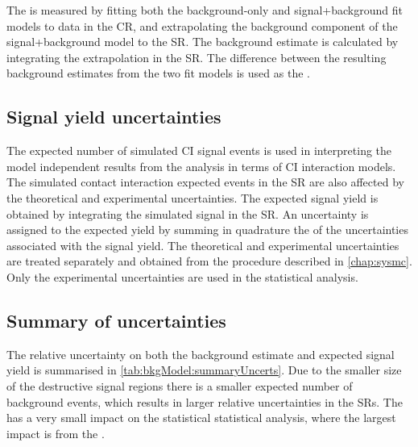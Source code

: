 The \CRBU is measured by fitting both the background-only and signal+background fit models to data in the CR, and extrapolating the background component of the signal+background model to the SR. The background estimate is calculated by integrating the extrapolation in the SR. The difference between the resulting background estimates from the two fit models is used as the \CRBU. 

\subsection{Signal yield uncertainties}
The expected number of simulated CI signal events is used in interpreting the model independent results from the analysis in terms of CI interaction models. The simulated contact interaction expected events in the SR are also affected by the theoretical and experimental uncertainties.  The expected signal yield is obtained by integrating the simulated signal in the SR. An uncertainty is assigned to the expected yield by summing in quadrature the of the uncertainties associated with the signal yield. The theoretical and experimental uncertainties are treated separately and obtained from the procedure described in \cref{chap:sysmc}. Only the experimental uncertainties are used in the statistical analysis. 

\subsection{Summary of uncertainties}

The relative uncertainty on both the background estimate and expected signal yield is summarised in \cref{tab:bkgModel:summaryUncerts}. Due to the smaller size of the destructive signal regions there is a smaller expected number of background events, which results in larger relative uncertainties in the SRs. The \CRBU has a very small impact on the statistical statistical analysis, where the largest impact is from the \STATU.

